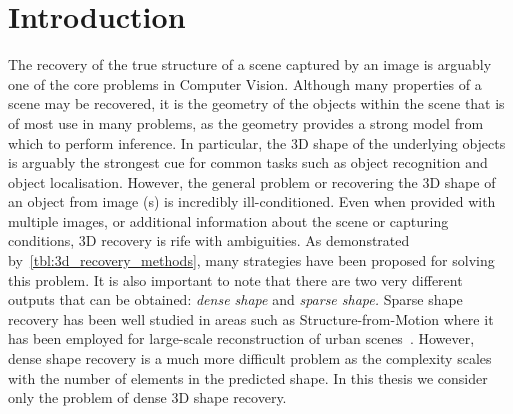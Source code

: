 \chapter{Introduction}\label{ch:intro}
The recovery of the true structure of a scene captured by an image is 
arguably one of the core problems in Computer Vision. Although many properties
of a scene may be recovered, it is the geometry of the objects within the scene
that is of most use in many problems, as the geometry provides a strong model
from which to perform inference. In particular, the 3D shape of the underlying
objects is arguably the strongest cue for common tasks such as object
recognition and object localisation. However, the general problem or recovering
the 3D shape of an object from image (s) is incredibly ill-conditioned. Even when 
provided with multiple images, or additional information about the scene or
capturing conditions, 3D recovery is rife with ambiguities. As demonstrated
by~\cref{tbl:3d_recovery_methods}, many strategies have been proposed for
solving this problem. It is also important to note that there are two very
different outputs that can be obtained: \textit{dense shape} and 
\textit{sparse shape.} Sparse shape recovery has been
well studied in areas such as Structure-from-Motion where it has been
employed for large-scale reconstruction of urban scenes~\cite{agarwal2009building,torr1998robust}.
However, dense shape recovery is a much more difficult problem as the
complexity scales with the number of elements in the predicted
shape. In this thesis we consider only the problem of dense 3D shape recovery.

